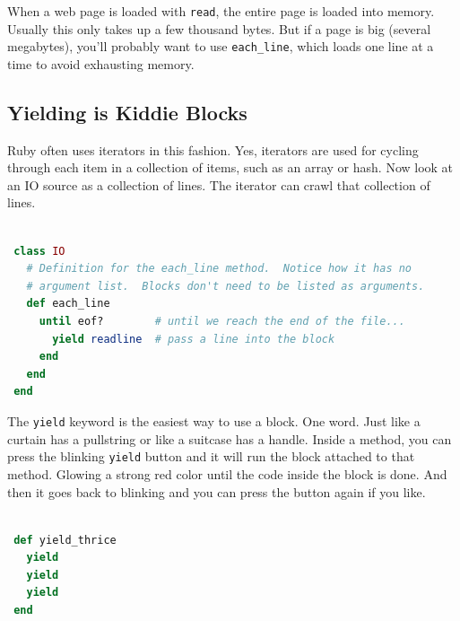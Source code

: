 \documentclass[10pt,twoside]{report}
\begin{document}
When a web page is loaded with \lstinline[breaklines=true]|read|, the
entire page is loaded into memory.  Usually this only takes up a few
thousand bytes.  But if a page is big (several megabytes), you'll
probably want to use \lstinline[breaklines=true]|each_line|, which
loads one line at a time to avoid exhausting memory.



\subsection{Yielding is Kiddie Blocks}



Ruby often uses iterators in this fashion.  Yes, iterators are used
for cycling through each item in a collection of items, such as an
array or hash.  Now look at an IO source as a collection of lines.
The iterator can crawl that collection of lines.


\begin{lstlisting}[basicstyle=\ttfamily\color{basiccolor},
    commentstyle = \ttfamily\color{commentcolor},
    keywordstyle=\ttfamily\color{keywordscolor},
    stringstyle=\color{stringcolor},
    language=Ruby,
    basicstyle=\small\ttfamily,
    showstringspaces=false,
  ]

 class IO
   # Definition for the each_line method.  Notice how it has no
   # argument list.  Blocks don't need to be listed as arguments.
   def each_line
     until eof?        # until we reach the end of the file...
       yield readline  # pass a line into the block
     end
   end
 end

\end{lstlisting}


The \lstinline[breaklines=true]|yield| keyword is the easiest way to
use a block.  One word.  Just like a curtain has a pullstring or like
a suitcase has a handle.  Inside a method, you can press the blinking
\lstinline[breaklines=true]|yield| button and it will run the block
attached to that method.  Glowing a strong red color until the code
inside the block is done.  And then it goes back to blinking and you
can press the button again if you like.


\begin{lstlisting}[basicstyle=\ttfamily\color{basiccolor},
    commentstyle = \ttfamily\color{commentcolor},
    keywordstyle=\ttfamily\color{keywordscolor},
    stringstyle=\color{stringcolor},
    language=Ruby,
    basicstyle=\small\ttfamily,
    showstringspaces=false,
  ]

 def yield_thrice
   yield
   yield
   yield
 end

\end{lstlisting}
\end{document}
